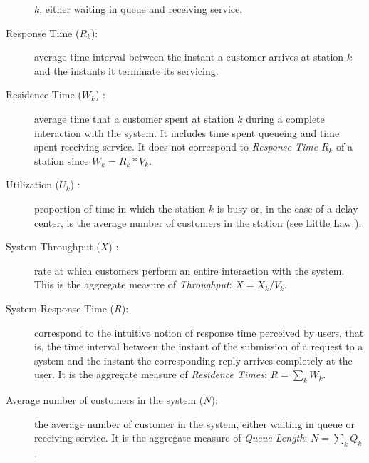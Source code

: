\begin{description}
$k$, either waiting in queue and receiving service.
\item[Response Time ($R_k$):] average time interval between the instant
a customer arrives at station $k$ and the instants it terminate its
servicing.
\item[Residence Time ($W_k$) :] average
time that a customer spent at station $k$ during a complete
interaction with the system. It includes time spent queueing and
time spent receiving service. It does not correspond to
\emph{Response Time} $R_k$ of a station since $W_k = R_k * V_k$.
\item[Utilization ($U_k$) :] proportion of time in which the station $k$ is busy or, in the case
of a delay center, is the average  number of  customers in the
station (see Little Law \cite{Little}).
\item[System Throughput ($X$) :] rate at which customers perform
an entire interaction with the system. This is the aggregate measure
of \emph{Throughput}: $X = X_k / V_k$.
\item[System Response Time ($R$):] correspond to the intuitive
notion of response time perceived by users, that is, the time
interval between the instant of the submission of a request to a
system and the instant the corresponding reply arrives completely at
the user. It is the aggregate measure of \emph{Residence Times}: $R
= \sum_k W_k$.
\item[Average number of customers in the system ($N$):] the average
number of customer in the system, either waiting in queue or
receiving service. It is the aggregate measure of \emph{Queue
Length}: $N = \sum_k Q_k$.
\end{description}

